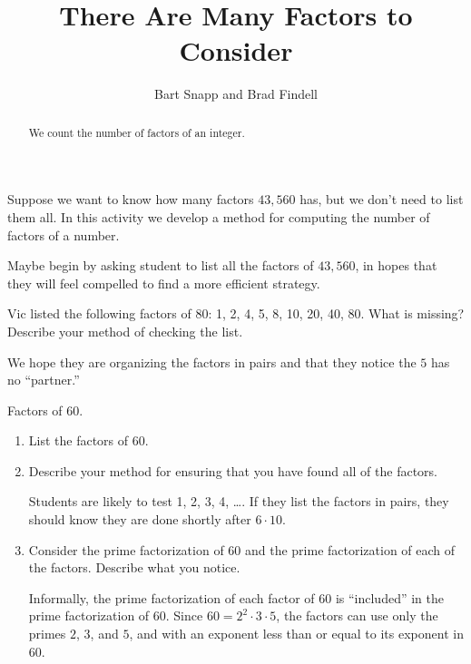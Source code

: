 \documentclass[nooutcomes]{ximera}
\title{There Are Many Factors to Consider}
\author{Bart Snapp and Brad Findell}
\begin{document}
\begin{abstract}
  We count the number of factors of an integer.
\end{abstract}
\maketitle

\label{A:CF}

Suppose we want to know how many factors $43,560$ has, but we don't need to list them all.  In this activity we develop a method for computing the number of factors of a number.  

\begin{teachingnote}
Maybe begin by asking student to list all the factors of $43,560$, in hopes that they will feel compelled to find a more efficient strategy.
\end{teachingnote}

\begin{problem}
Vic listed the following factors of 80:  1, 2, 4, 5, 8, 10, 20, 40, 80.  What is missing? Describe your method of checking the list.  
\vspace{0.2in}
\begin{teachingnote}
We hope they are organizing the factors in pairs and that they notice the $5$ has no ``partner.''  
\end{teachingnote}
\end{problem}

\begin{problem} Factors of 60. 
\begin{enumerate}
\item List the factors of 60. 
\vspace{0.2in}
\item Describe your method for ensuring that you have found all of the factors. 
\vspace{0.2in}
\begin{teachingnote}
Students are likely to test 1, 2, 3, 4, \dots.  If they list the factors in pairs, they should know they are done shortly after $6\cdot10$. 
\end{teachingnote}
\item Consider the prime factorization of 60 and the prime factorization of each of the factors.  Describe what you notice.   
\vspace{0.2in}
\begin{teachingnote}
Informally, the prime factorization of each factor of $60$ is ``included'' in the prime factorization of $60$.  Since $60=2^2\cdot 3\cdot5$, the factors can use only the primes $2$, $3$, and $5$, and with an exponent less than or equal to its exponent in $60$.  
\end{teachingnote}
\end{enumerate}
\end{problem}
\end{document}
